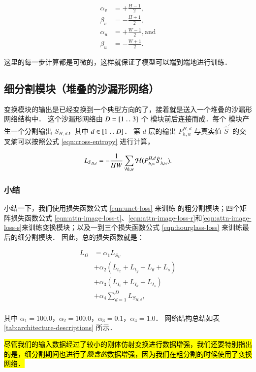 $$
\begin{aligned}
\alpha_v & = +\frac{H-1}{2},               \\
\beta_v  & = -\frac{H+1}{2},              \\
\alpha_u & = +\frac{W-1}{2}, \mathrm{ and} \\
\beta_u  & = - \frac{W+1}{2}.
\end{aligned}
$$

\noindent 这里的每一步计算都是可微的，这样就保证了模型可以端到端地进行训练．

\subsection{细分割模块（堆叠的沙漏形网络）}\label{sec:hourglass}

变换模块的输出是已经变换到一个典型方向的了，接着就是送入一个堆叠的沙漏形网络结构中．
这个沙漏形网络由 $D = [1 \mathrel{{.}\,{.}}\nobreak 3]$ 个 \UNet{} 模块前后连接而成．每个 \UNet{} 模块产生一个分割输出 $S_{H,d}$，其中 $d \in [1 \mathrel{{.}\,{.}}\nobreak D]$．
第 $d$ 层的输出 $P^{H,d}_{h,w}$ 与真实值 $\hat{S}^\prime$ 的交叉熵可以按照公式 \eqref{eqn:cross-entropy} 进行计算，

\begin{equation}\label{eqn:hourglass-loss}
L_{S_{H,d}} = -\frac{1}{HW} \sum_{\forall h,w} \mathcal{H}(P^{H,d}_{h,w}\hat{S}^\prime_{h,w}).
\end{equation}

\subsubsection{小结}

小结一下，我们使用损失函数公式 \ref{eqn:unet-loss} 来训练 \omeganet{} 的粗分割模块；四个矩阵损失函数公式 \ref{eqn:attn-image-loss-t}、\ref{eqn:attn-image-loss-r}和\ref{eqn:attn-image-loss-s}来训练变换模块；以及一到三个损失函数公式 \ref{eqn:hourglass-loss} 来训练最后的细分割模块．
因此，总的损失函数就是：

\begin{equation}
\begin{aligned}
L_\Omega & = \alpha_1 L_{S_U} \\
  & + \alpha_2 (L_{t_x} + L_{t_y} + L_{\theta}+ L_{s}) \\
  & + \alpha_3 (L_{I_t} + L_{I_\theta} + L_{I_s}) \\
  & + \alpha_4 \sum_{d=1}^D L_{S_{H,d}}, \\
\end{aligned}
\end{equation}

\noindent 其中 $\alpha_1 = 100.0$，$\alpha_2 = 100.0$，$\alpha_3 = 0.1$，$\alpha_4 = 1.0$．
网络结构总结如表 \ref{tab:architecture-descriptions} 所示．

\hl{
尽管我们的输入数据经过了较小的刚体仿射变换进行数据增强，我们还要特别指出的是，细分割期间也进行了\emph{隐含的}数据增强，因为我们在粗分割的时候使用了变换网络．
}
